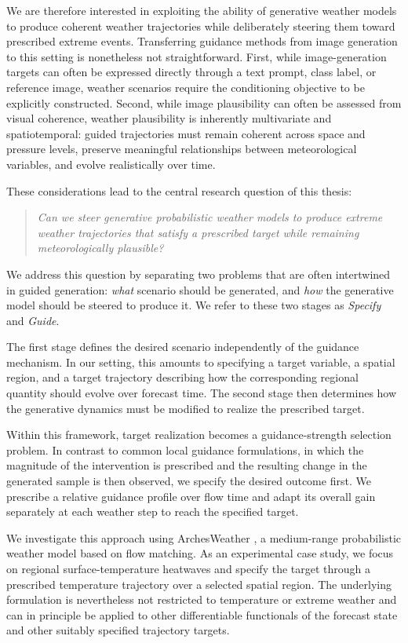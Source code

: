 We are therefore interested in exploiting the ability of generative weather
models to produce coherent weather trajectories while deliberately steering
them toward prescribed extreme events.
Transferring guidance methods from image generation to this setting is
nonetheless not straightforward.
First, while image-generation targets can often be expressed directly through
a text prompt, class label, or reference image, weather scenarios require the
conditioning objective to be explicitly constructed.
Second, while image plausibility can often be assessed from visual coherence,
weather plausibility is inherently multivariate and spatiotemporal: guided
trajectories must remain coherent across space and pressure levels, preserve
meaningful relationships between meteorological variables, and evolve
realistically over time.

These considerations lead to the central research question of this thesis:

\begin{quote}
\emph{Can we steer generative probabilistic weather models to produce extreme
weather trajectories that satisfy a prescribed target while remaining
meteorologically plausible?}
\end{quote}

We address this question by separating two problems that are often intertwined
in guided generation: \emph{what} scenario should be generated, and \emph{how}
the generative model should be steered to produce it. We refer to these two
stages as \emph{Specify} and \emph{Guide}.

The first stage defines the desired scenario independently of the guidance
mechanism. In our setting, this amounts to specifying a target variable, a
spatial region, and a target trajectory describing how the corresponding
regional quantity should evolve over forecast time. The second stage then
determines how the generative dynamics must be modified to realize the
prescribed target.

Within this framework, target realization becomes a guidance-strength
selection problem. In contrast to common local guidance formulations, in which
the magnitude of the intervention is prescribed and the resulting change in the
generated sample is then observed, we specify the desired outcome first. We
prescribe a relative guidance profile over flow time and adapt its overall gain
separately at each weather step to reach the specified target.

We investigate this approach using ArchesWeather
\parencite{couairon2024archesweather}, a medium-range probabilistic weather
model based on flow matching. As an experimental case study, we focus on
regional surface-temperature heatwaves and specify the target through a
prescribed temperature trajectory over a selected spatial region. The
underlying formulation is nevertheless not restricted to temperature or
extreme weather and can in principle be applied to other differentiable
functionals of the forecast state and other suitably specified trajectory
targets.

